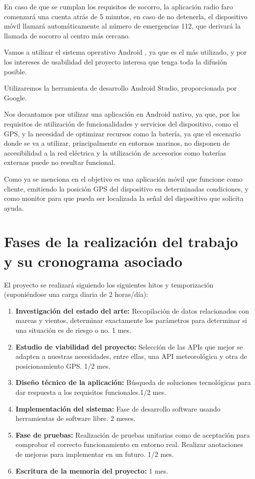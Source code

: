 En caso de que se cumplan los requisitos de socorro, la aplicación radio faro comenzará una cuenta atrás de 5 minutos, en caso de no detenerla, el dispositivo móvil llamará automáticamente al número de emergencias 112, que derivará la llamada de socorro al centro más cercano.

Vamos a utilizar el sistema operativo Android \cite{Android}, ya que es el más utilizado, y por los intereses de usabilidad del proyecto interesa que tenga toda la difusión posible.

Utilizaremos la herramienta de desarrollo Android Studio, proporcionada por Google. \cite{AS}

Nos decantamos por utilizar una aplicación en Android nativo, ya que, por los requisitos de utilización de funcionalidades y servicios del dispositivo, como el GPS, y la necesidad de optimizar recursos como la batería, ya que el escenario donde se va a utilizar, principalmente en entornos marinos, no disponen de accesibilidad a la red eléctrica y la utilización de accesorios como baterías externas puede no resultar funcional.


Como ya se menciona en \cite{VRUIZ} el objetivo es una aplicación móvil que funcione como cliente, emitiendo la posición GPS del dispositivo en determinadas condiciones, y como monitor para que pueda ser localizada la señal del dispositivo que solicita ayuda.

\section{Fases de la realización del trabajo y su cronograma asociado}
El proyecto se realizará siguiendo los siguientes hitos y temporización (suponiéndose una carga diaria de 2 horas/día): 
\begin{enumerate}
\item  \textbf{Investigación del 
estado del arte:} Recopilación de datos 
relacionados con mareas y vientos, 
determinar exactamente los parámetros para
 determinar si una situación es de riesgo o no. 1 mes.
\item  \textbf{Estudio de viabilidad del proyecto:} Selección de las APIs que mejor se adapten a nuestras necesidades, entre ellas, una API meteorológica y otra de posicionamiento GPS. 1/2 mes.
\item  \textbf{Diseño técnico de la aplicación:} Búsqueda de soluciones tecnológicas para dar respuesta a los requisitos funcionales.1/2 mes.
\item  \textbf{Implementación del sistema:} Fase de desarrollo software usando herramientas de software libre. 2 meses.
\item  \textbf{Fase de pruebas:} Realización de pruebas unitarias como de aceptación para comprobar el correcto funcionamiento en entorno real. Realizar anotaciones de mejoras para implementar en un futuro. 1/2 mes.
\item  \textbf{Escritura de la memoria del proyecto:} 1 mes.
\end{enumerate}

